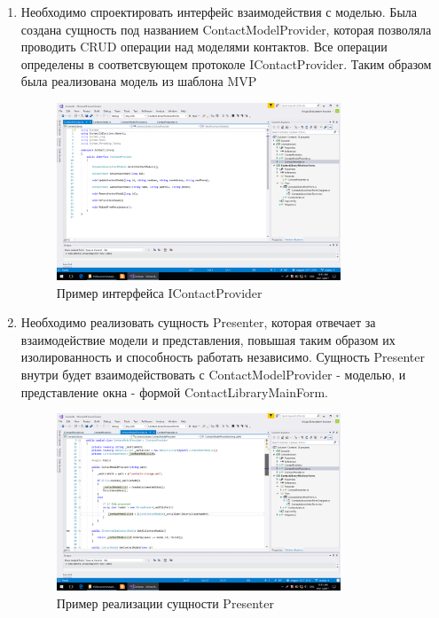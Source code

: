 \documentclass[14pt,a4paper]{extreport}
\begin{document}

\begin{enumerate}

\item Необходимо спроектировать интерфейс взаимодействия с моделью. Была создана сущность под названием ContactModelProvider, которая позволяла проводить CRUD операции над моделями контактов. Все операции определены в соответсвующем протоколе IContactProvider. Таким образом была реализована модель из шаблона MVP

\begin{figure}[ht]
\centering
\includegraphics[width=0.8\textwidth]{../screenshots/Screenshot_1}
\caption{Пример интерфейса IContactProvider}
\end{figure}

\item Необходимо реализовать сущность Presenter, которая отвечает за взаимодействие модели и представления, повышая таким образом их изолированность и способность работать независимо. Сущность Presenter внутри будет взаимодействовать с ContactModelProvider - моделью, и представление окна - формой ContactLibraryMainForm.

\begin{figure}[ht]
\centering
\includegraphics[width=0.8\textwidth]{../screenshots/Screenshot_2}
\caption{Пример реализации сущности Presenter}
\end{figure}


\end{enumerate}
\end{document}
